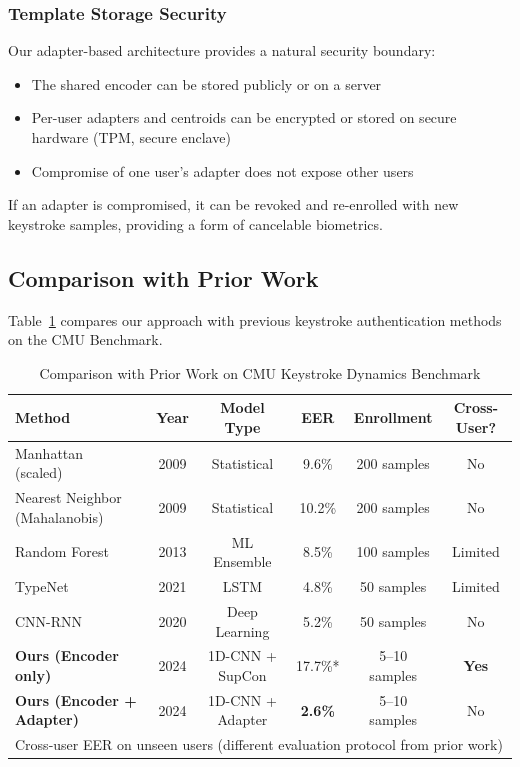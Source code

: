 \documentclass{ieeeaccess}
\begin{document}
{\subsubsection{Template Storage Security}
Our adapter-based architecture provides a natural security boundary:
\begin{itemize}
\item The shared encoder can be stored publicly or on a server
\item Per-user adapters and centroids can be encrypted or stored on secure hardware (TPM, secure enclave)
\item Compromise of one user's adapter does not expose other users
\end{itemize}

If an adapter is compromised, it can be revoked and re-enrolled with new keystroke samples, providing a form of cancelable biometrics.

\subsection{Comparison with Prior Work}

Table~\ref{tab:prior_work} compares our approach with previous keystroke authentication methods on the CMU Benchmark.

\begin{table}[t]
\caption{Comparison with Prior Work on CMU Keystroke Dynamics Benchmark}
\label{tab:prior_work}
\centering
\begin{tabular}{|l|c|c|c|c|c|}
\hline
\textbf{Method} & \textbf{Year} & \textbf{Model Type} & \textbf{EER} & \textbf{Enrollment} & \textbf{Cross-User?} \\
\hline
Manhattan (scaled)~\cite{b4} & 2009 & Statistical & 9.6\% & 200 samples & No \\
Nearest Neighbor (Mahalanobis)~\cite{b4} & 2009 & Statistical & 10.2\% & 200 samples & No \\
Random Forest~\cite{b5} & 2013 & ML Ensemble & 8.5\% & 100 samples & Limited \\
TypeNet~\cite{b13} & 2021 & LSTM & 4.8\% & 50 samples & Limited \\
CNN-RNN~\cite{b8} & 2020 & Deep Learning & 5.2\% & 50 samples & No \\
\hline
\textbf{Ours (Encoder only)} & 2024 & 1D-CNN + SupCon & 17.7\%* & 5--10 samples & \textbf{Yes} \\
\textbf{Ours (Encoder + Adapter)} & 2024 & 1D-CNN + Adapter & \textbf{2.6\%} & 5--10 samples & No \\
\hline
\multicolumn{6}{l}{\footnotesize *Cross-user EER on unseen users (different evaluation protocol from prior work)} \\
\end{tabular}
\end{table}

}
\end{document}
